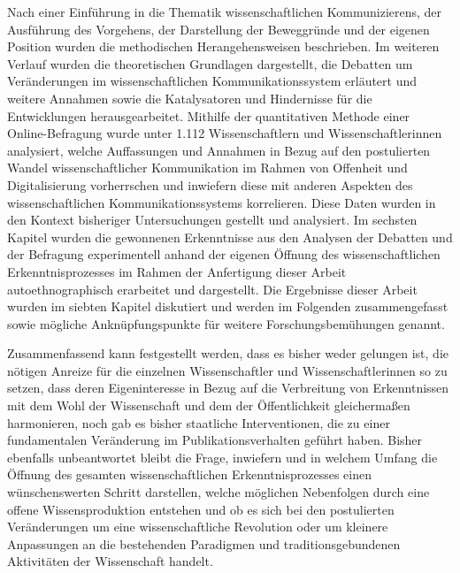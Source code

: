 Nach einer Einführung in die Thematik wissenschaftlichen Kommunizierens, der Ausführung des Vorgehens, der Darstellung der Beweggründe und der eigenen Position wurden die methodischen Herangehensweisen beschrieben. Im weiteren Verlauf wurden die theoretischen Grundlagen dargestellt, die Debatten um Veränderungen im wissenschaftlichen Kommunikationssystem erläutert und weitere Annahmen sowie die Katalysatoren und Hindernisse für die Entwicklungen herausgearbeitet. Mithilfe der quantitativen Methode einer Online-Befragung wurde unter 1.112 Wissenschaftlern und Wissenschaftlerinnen analysiert, welche Auffassungen und Annahmen in Bezug auf den postulierten Wandel wissenschaftlicher Kommunikation im Rahmen von Offenheit und Digitalisierung vorherrschen und inwiefern diese mit anderen Aspekten des wissenschaftlichen Kommunikationssystems korrelieren. Diese Daten wurden in den Kontext bisheriger Untersuchungen gestellt und analysiert. Im sechsten Kapitel wurden die gewonnenen Erkenntnisse aus den Analysen der Debatten und der Befragung experimentell anhand der eigenen Öffnung des wissenschaftlichen Erkenntnisprozesses im Rahmen der Anfertigung dieser Arbeit autoethnographisch erarbeitet und dargestellt. Die Ergebnisse dieser Arbeit wurden im siebten Kapitel diskutiert und werden im Folgenden zusammengefasst sowie mögliche Anknüpfungspunkte für weitere Forschungsbemühungen genannt.

Zusammenfassend kann festgestellt werden, dass es bisher weder gelungen ist, die nötigen Anreize für die einzelnen Wissenschaftler und Wissenschaftlerinnen so zu setzen, dass deren Eigeninteresse in Bezug auf die Verbreitung von Erkenntnissen mit dem Wohl der Wissenschaft und dem der Öffentlichkeit gleichermaßen harmonieren, noch gab es bisher staatliche Interventionen, die zu einer fundamentalen Veränderung im Publikationsverhalten geführt haben. Bisher ebenfalls unbeantwortet bleibt die Frage, inwiefern und in welchem Umfang die Öffnung des gesamten wissenschaftlichen Erkenntnisprozesses einen wünschenswerten Schritt darstellen, welche möglichen Nebenfolgen durch eine offene Wissensproduktion entstehen und ob es sich bei den postulierten Veränderungen um eine wissenschaftliche Revolution oder um kleinere Anpassungen an die bestehenden Paradigmen und traditionsgebundenen Aktivitäten der Wissenschaft handelt.

